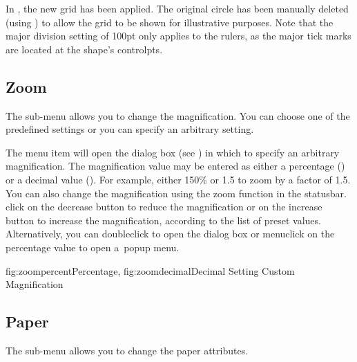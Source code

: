 In , the new grid has been applied.  The
original circle has been manually deleted (using ) to
allow the grid to be shown for illustrative purposes. Note that the
major division setting of 100\gls{pt} only applies to the rulers, as
the major tick marks are located at the shape's \glspl{controlpt}.



\subsection{Zoom}\label{sec:zoommenu}


The  sub-menu allows you to change
the magnification. You can choose one of the predefined
settings or you can specify an arbitrary setting.


The  menu item will open the
 dialog box (see ) in
which to specify an arbitrary magnification.  The magnification
value may be entered as either a percentage
() or a decimal value
(). For example, either 150\% or 1.5 to
zoom by a factor of 1.5.  You can also change the magnification
using the zoom function in the \gls{statusbar}. \Gls{click} on the
decrease button  to reduce the magnification or
on the increase button  to increase the
magnification, according to the list of preset values.
Alternatively, you can \gls{doubleclick} to open the 
dialog box or \gls{menuclick} on the percentage value to open
a~popup menu.

 {
   {fig:zoompercent}{}{Percentage},
   {fig:zoomdecimal}{}{Decimal}
 }
 {Setting Custom Magnification}

\subsection{Paper}\label{sec:papermenu}


The  sub-menu allows you to change
the \gls{paper} attributes.



